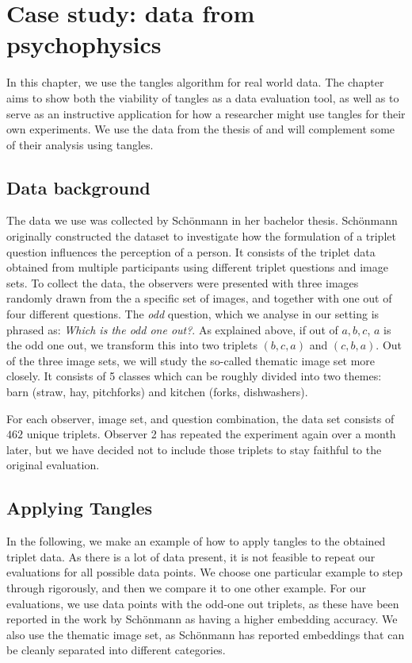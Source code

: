 \chapter{Case study: data from psychophysics}\label{real}
In this chapter, we use the tangles algorithm for real world data. 
The chapter aims to show both the viability of tangles as a data evaluation tool, as well as to serve as an 
instructive application for how a researcher might use tangles for their own experiments. We use the data
from the thesis of \cite{inesschonmannSimilarityJudgementsNatural2021}
and will complement some of their analysis using tangles. 

\section{Data background}
The data we use was collected by Schönmann in her bachelor thesis. Schönmann originally
constructed the dataset to investigate how the formulation of a triplet question influences 
the perception of a person. It consists of the triplet data obtained from multiple
participants using different triplet questions and image sets.
To collect the data, the observers were presented with three images randomly drawn from the a specific set of images, and together with one out of four different questions. 
The \textit{odd} question, which we analyse in our setting is phrased as: \textit{Which is the odd one out?}.  
As explained above, if out of $a,b,c$, $a$ is the odd one out, we transform this into two triplets $(b, c, a)$ and $(c, b, a)$.
Out of the three image sets, we will study the 
so-called thematic image set more closely. It consists of 5 classes which can be roughly divided into two themes: barn (straw, hay, pitchforks) and kitchen (forks, dishwashers).

For each observer, image set, and question combination, the data set consists of $462$ unique triplets. 
Observer 2 has repeated the experiment again over a month later, but we have decided not to include those triplets to stay faithful to the original evaluation.

\section{Applying Tangles}
In the following, we make an example of how to apply tangles to the obtained triplet data.
As there is a lot of data present, it is not feasible to repeat our evaluations for all possible data points.
We choose one particular example to step through rigorously, and then we compare it to one other example. 
For our evaluations, we use data points with the odd-one out triplets, as these have been reported in the work by Schönmann as 
having a higher embedding accuracy. We also use the thematic image set, as Schönmann has reported embeddings that can be cleanly 
separated into different categories.


